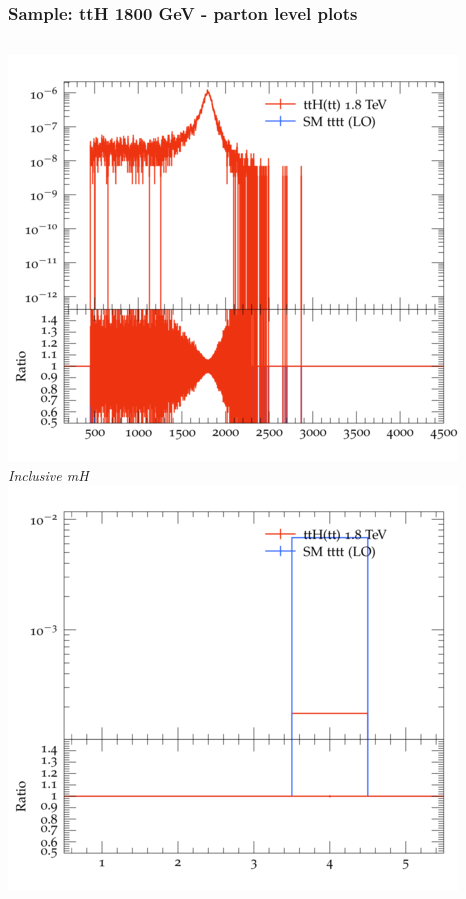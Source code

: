 \documentclass{beamer}
\begin{document}
\begin{frame}
\frametitle{Sample: ttH 1800 GeV - parton level plots}
\begin{columns}
\includegraphics[width=\textwidth]{../plots/ttH_1800/tttt_ttH/Inclusive_mH.png}\\
\textit{\small Inclusive mH}
\includegraphics[width=\textwidth]{../plots/ttH_1800/tttt_ttH/Inclusive_nTop.png}\\

\end{columns}
\end{frame}
\end{document}
